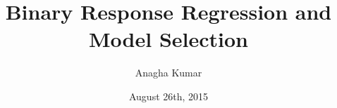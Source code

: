 \title[ Applied Bayesian Data Analysis]{Binary Response Regression and Model Selection}
\institute[]{}
\author[ Anagha Kumar]{Anagha Kumar}
\date{August 26th, 2015} 